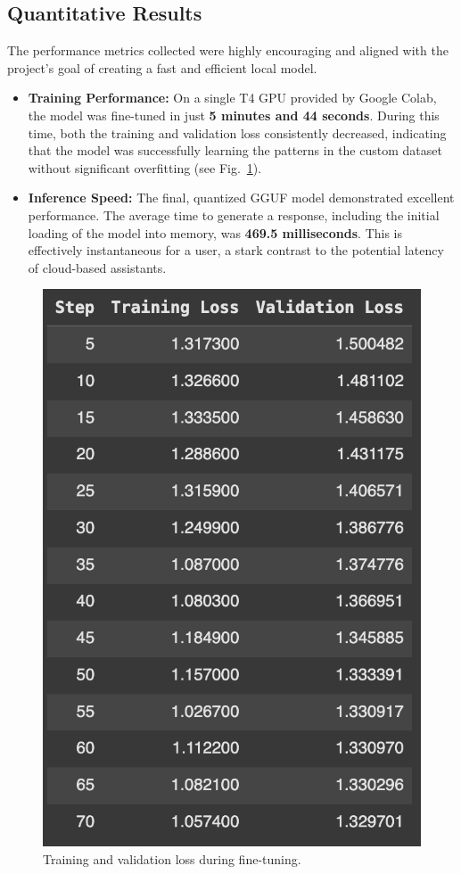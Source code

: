 \documentclass[conference]{IEEEtran}
\begin{document}
\subsection{Quantitative Results}
The performance metrics collected were highly encouraging and aligned with the project's goal of creating a fast and efficient local model.
\begin{itemize}
    \item \textbf{Training Performance:} On a single T4 GPU provided by Google Colab, the model was fine-tuned in just \textbf{5 minutes and 44 seconds}. During this time, both the training and validation loss consistently decreased, indicating that the model was successfully learning the patterns in the custom dataset without significant overfitting (see Fig.~\ref{fig:training_loss}).
    \item \textbf{Inference Speed:} The final, quantized GGUF model demonstrated excellent performance. The average time to generate a response, including the initial loading of the model into memory, was \textbf{469.5 milliseconds}. This is effectively instantaneous for a user, a stark contrast to the potential latency of cloud-based assistants.
\end{itemize}

\begin{figure}[H]
    \centering
    \includegraphics[width=0.9\linewidth]{images/training_loss.png}
    \caption{Training and validation loss during fine-tuning.}
    \label{fig:training_loss}
\end{figure}
\end{document}
